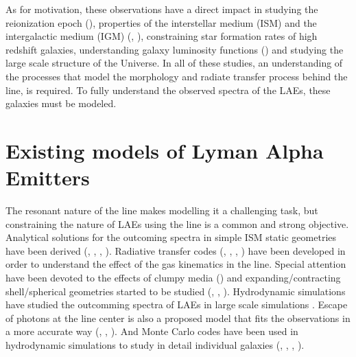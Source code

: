 As for motivation, these observations have a direct impact in studying the reionization epoch (\cite{review}), properties of the interstellar medium (ISM) and the intergalactic medium (IGM) (\cite{Behrens13}, \cite{DijkstraKramer}), constraining star formation rates of high redshift galaxies, understanding galaxy luminosity functions (\cite{Max}) and studying the large scale structure of the Universe. In all of these studies, an understanding of the processes that model the morphology and radiate transfer process behind the \lya line, is required. To fully understand the observed spectra of the LAEs, these galaxies must be modeled. \\

\section{Existing models of Lyman Alpha Emitters}

The resonant nature of the \lya line makes modelling it a challenging task, but constraining the nature of LAEs using the line is a common and strong objective. Analytical solutions for the outcoming spectra in simple ISM static geometries have been derived (\cite{Adams72}, \cite{Harrington73}, \cite{Neufeld90}, \cite{Dijkstra06}). Radiative transfer codes (\cite{DijkstraKramer}, \cite{Laursen09}, \cite{Verhamme06}, \cite{CLARA}) have been developed in order to understand the effect of the gas kinematics in the \lya line. Special attention have been devoted to  the effects of clumpy media (\cite{Hansen06}) and expanding/contracting shell/spherical geometries started to be studied (\cite{Ahn03}, \cite{Verhamme06}, \cite{Dijkstra06}). Hydrodynamic simulations have studied the outcomming spectra of LAEs in large scale simulations \cite{Forero12}. Escape of \lya photons at the line center is also a proposed model that fits the observations in a more accurate way (\cite{Martin2015}, \cite{Garavito14}, \cite{Neufeld91}). And Monte Carlo codes have been used in hydrodynamic simulations to study in detail individual galaxies (\cite{Laursen09}, \cite{Barnes11}, \cite{Verhamme12}, \cite{Yajima12}).\\


